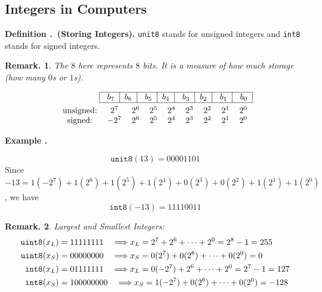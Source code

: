 \documentclass[12pt, a4paper]{article}
\newcounter{index}[subsection]
\newenvironment*{df}[1]{\par\noindent\textbf{Definition \thesubsection.\stepcounter{index}\theindex\ (#1).}}{\par}
\newenvironment*{eg}[1]{\begin{framed}\par\noindent\textbf{Example \thesubsection.\stepcounter{index}\theindex\ #1} \par}{\par\end{framed}}
\newtheorem{rmk}{Remark.}[section]
\begin{document}
\subsection{Integers in Computers}
\begin{df}{Storing Integers}
	\texttt{unit8} stands for unsigned integers and \texttt{int8} stands for signed integers. 
	\begin{rmk} The $8$ here represents $8$ bits. It is a measure of how much storage (how many $0$s or $1$s).\end{rmk}
	\[\begin{aligned}
	\begin{tabular}{|c|c|c|c|c|c|c|c|}
		\hline
		\ $b_7$&$b_6$\ &\ $b_5$&$b_4$\ &\ $b_3$&$b_2$\ &\ $b_1$&\ $b_0$\\
		\hline
	\end{tabular}&\\
	\begin{tabular}{ccccccccc}	
		unsigned: &$2^7$&$2^6$&$2^5$&$2^4$&$2^3$&$2^2$&$2^1$&$2^0$\\
		signed:   &$-2^7$&$2^6$&$2^5$&$2^4$&$2^3$&$2^2$&$2^1$&$2^0$
	\end{tabular}&
	\end{aligned}\]
\end{df}
\begin{eg}{}
	\[\texttt{unit8}(13)=00001101\] Since $-13=1(-2^7)+1(2^6)+1(2^5)+1(2^4)+0(2^3)+0(2^2)+1(2^1)+1(2^0)$, we have \[\texttt{int8}(-13)=11110011\]
\end{eg}
\begin{rmk}
	Largest and Smallest Integers: \[\begin{aligned}\textnormal{\texttt{uint8}}(x_L)&=11111111\quad\Longrightarrow x_L=2^7+2^6+\cdots+2^0=2^8-1=255\\\textnormal{\texttt{uint8}}(x_S)&=00000000\quad\Longrightarrow x_S=0(2^7)+0(2^6)+\cdots+0(2^0)=0\\\textnormal{\texttt{int8}}(x_L)&=01111111\quad\Longrightarrow x_L=0(-2^7)+2^6+\cdots+2^0=2^7-1=127\\\textnormal{\texttt{int8}}(x_S)&=100000000\quad\Longrightarrow x_S=1(-2^7)+0(2^6)+\cdots+0(2^0)=-128\end{aligned}\]	
\end{rmk}
\end{document}
